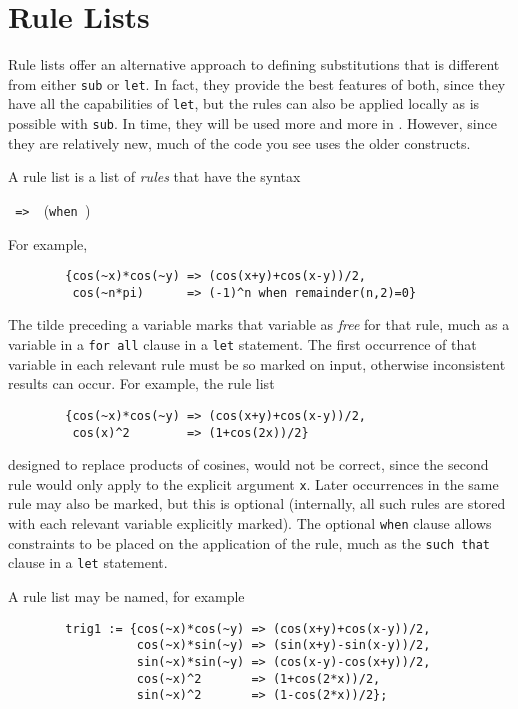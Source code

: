 \section{Rule Lists} 

Rule lists offer an alternative approach to defining substitutions that is
different from either \texttt{sub} or \texttt{let}.  In fact, they provide the
best features of both, since they have all the capabilities of \texttt{let},
but the rules can also be applied locally as is possible with \texttt{sub}.
In time, they will be used more and more in {\REDUCE}.  However, since they
are relatively new, much of the {\REDUCE} code you see uses the older
constructs.

\hypertarget{reserved:WHEN}{}
A rule list is a list of \emph{rules} that have the syntax
\begin{syntax}
     \texttt{ => }\ (\texttt{when })
\end{syntax}
For example,
\begin{verbatim}
        {cos(~x)*cos(~y) => (cos(x+y)+cos(x-y))/2,
         cos(~n*pi)      => (-1)^n when remainder(n,2)=0}
\end{verbatim}

The tilde preceding a variable marks that variable as \emph{free} for that
rule, much as a variable in a \texttt{for all} clause in a \texttt{let}
statement.  The first occurrence of that variable in each relevant rule
must be so marked on input, otherwise inconsistent results can occur.
For example, the rule list
\begin{verbatim}
        {cos(~x)*cos(~y) => (cos(x+y)+cos(x-y))/2,
         cos(x)^2        => (1+cos(2x))/2}
\end{verbatim}
designed to replace products of cosines, would not be correct, since the
second rule would only apply to the explicit argument \texttt{x}.  Later
occurrences in the same rule may also be marked, but this is optional
(internally, all such rules are stored with each relevant variable
explicitly marked).  The optional \texttt{when} clause allows
constraints to be placed on the application of the rule, much as the 
\texttt{such that} clause in a \texttt{let} statement.

A rule list may be named, for example
\begin{verbatim}
        trig1 := {cos(~x)*cos(~y) => (cos(x+y)+cos(x-y))/2,
                  cos(~x)*sin(~y) => (sin(x+y)-sin(x-y))/2,
                  sin(~x)*sin(~y) => (cos(x-y)-cos(x+y))/2,
                  cos(~x)^2       => (1+cos(2*x))/2,
                  sin(~x)^2       => (1-cos(2*x))/2};
\end{verbatim}

